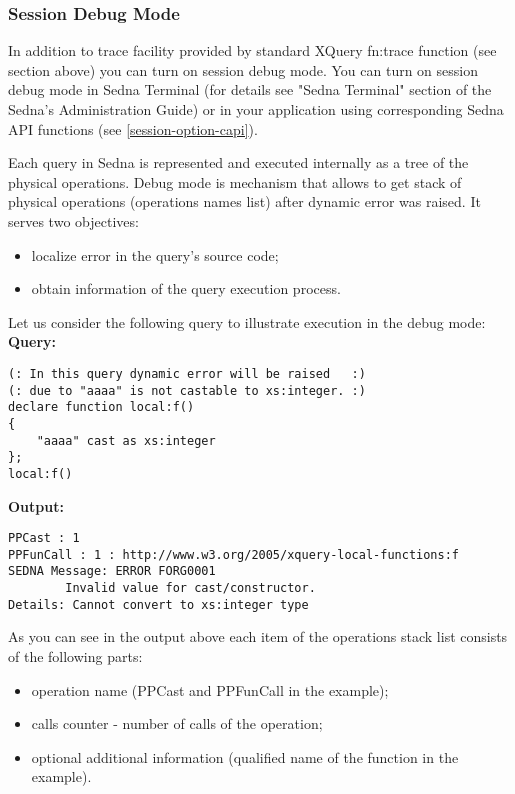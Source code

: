 \documentclass[a4paper,12pt]{article}
\begin{document}
\subsubsection{Session Debug Mode}
\label{session-debug-mode}
In addition to trace facility provided by standard XQuery fn:trace function (see section above) you can turn on session debug mode. You can turn on session debug mode in Sedna Terminal (for details see "Sedna Terminal" section of the Sedna's Administration Guide) or in your application using corresponding Sedna API functions (see \ref{session-option-capi}).

Each query in Sedna is represented and executed internally as a tree of the physical operations. Debug mode is mechanism that allows to get stack of physical operations (operations names list) after dynamic error was raised. It serves two objectives:

\begin{itemize}
\item localize error in the query's source code;
\item obtain information of the query execution process.
\end{itemize}

Let us consider the following query to illustrate execution in the debug mode:
\newline
\newline
\textbf{Query:}

\begin{verbatim}
(: In this query dynamic error will be raised   :)
(: due to "aaaa" is not castable to xs:integer. :)
declare function local:f()
{
    "aaaa" cast as xs:integer
};
local:f()
\end{verbatim}
\textbf{Output:}

\begin{verbatim}
PPCast : 1
PPFunCall : 1 : http://www.w3.org/2005/xquery-local-functions:f
SEDNA Message: ERROR FORG0001
        Invalid value for cast/constructor.
Details: Cannot convert to xs:integer type
\end{verbatim}

As you can see in the output above each item of the operations stack list consists of the following parts:

\begin{itemize}
\item operation name (PPCast and PPFunCall in the example);
\item calls counter - number of calls of the operation;
\item optional additional information (qualified name of the function in the example).
\end{itemize}
\end{document}
